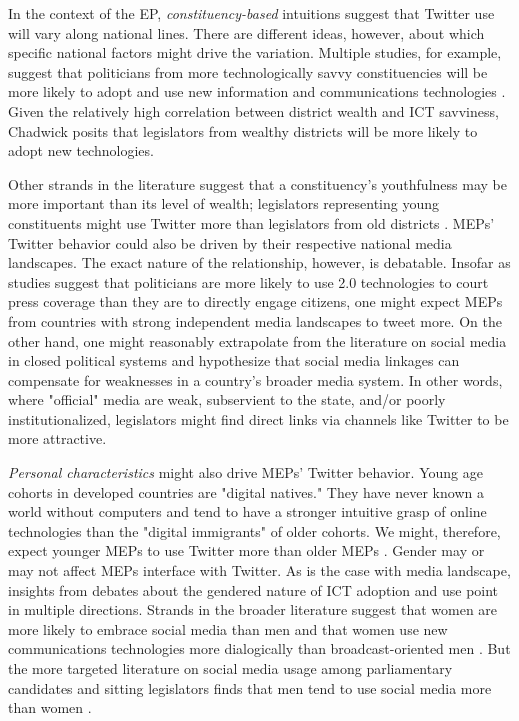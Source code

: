 \documentclass[12pt]{article}\usepackage[]{graphicx}\usepackage[]{color}
\begin{document}
    	In the context of the EP, \emph{constituency-based} intuitions suggest that Twitter use will vary along national lines. There are different ideas, however, about which specific national factors might drive the variation. Multiple studies, for example, suggest that politicians from more technologically savvy constituencies will be more likely to adopt and use new information and communications technologies \cite{adler.gent.overmeyer.1998, hernnson.stokes-brown.hindman.2007, peterson.2012, chadwick.2006, klotz.2004}. Given the relatively high correlation between district wealth and ICT savviness, Chadwick \citeyear{chadwick.2006} posits that legislators from wealthy districts will be more likely to adopt new technologies. 
	
	Other strands in the literature suggest that a constituency's youthfulness may be more important than its level of wealth; legislators representing young constituents might use Twitter more than legislators from old districts \cite{peterson.2012}. MEPs' Twitter behavior could also be driven by their respective national media landscapes. The exact nature of the relationship, however, is debatable. Insofar as studies \cite{ausserhoffer.maireder.2013, glassman.straus.shogan.2013, williams.gulati.2010} suggest that politicians are more likely to use 2.0 technologies to court press coverage than they are to directly engage citizens, one might expect MEPs from countries with strong independent media landscapes to tweet more. On the other hand, one might reasonably extrapolate from the literature on social media in closed political systems \cite{diamond.plattner.2012, shirky.2011} and hypothesize that social media linkages can compensate for weaknesses in a country's broader media system. In other words, where "official" media are weak, subservient to the state, and/or poorly institutionalized, legislators might find direct links via channels like Twitter to be more attractive.
    
    	\emph{Personal characteristics} might also drive MEPs' Twitter behavior. Young age cohorts in developed countries are "digital natives." They have never known a world without computers and tend to have a stronger intuitive grasp of online technologies than the "digital immigrants" of older cohorts. We might, therefore, expect younger MEPs to use Twitter more than older MEPs \cite{bolton.et.al.2013, peterson.2012}. Gender may or may not affect MEPs interface with Twitter. As is the case with media landscape, insights from debates about the gendered nature of ICT adoption and use point in multiple directions. Strands in the broader literature suggest that women are more likely to embrace social media than men \cite{hargittai.2007} and that women use new communications technologies more dialogically than broadcast-oriented men \cite{wei.lo.2006}. But the more targeted literature on social media usage among parliamentary candidates and sitting legislators finds that men tend to use social media more than women \cite{vergeer.hermans.sams.2011, ausserhoffer.maireder.2013}. 
      
\end{document}
